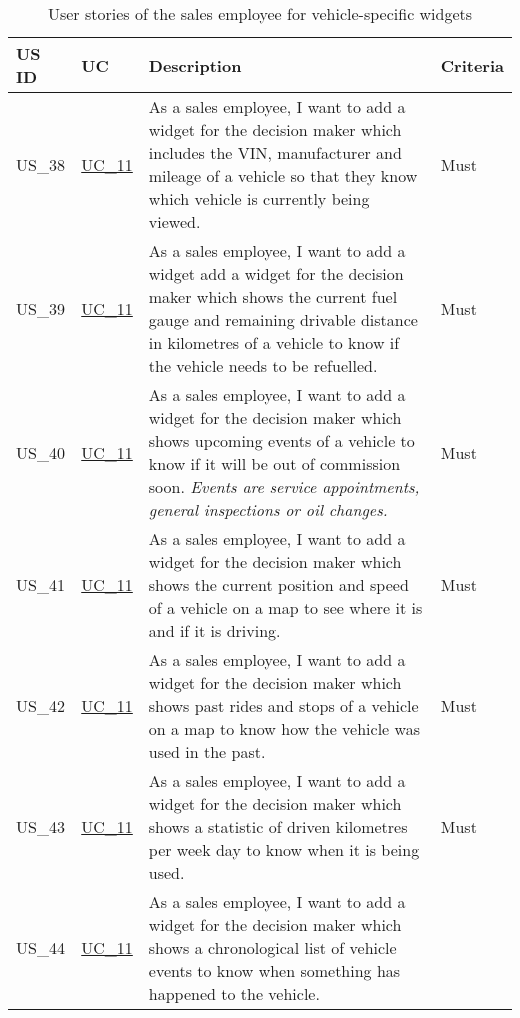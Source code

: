   \sffamily
  \begin{footnotesize}
    \label{FahrzeugWidgets}
    \begin{longtable}[L L L]{ p{} p{} p{} p{} }
      \caption                       %
          {User stories of the sales employee for vehicle-specific widgets} %
          \\
      \toprule
      \textbf{US ID} & \textbf{UC} & \textbf{Description} & \textbf{Criteria} \\
      \midrule
      \hypertarget{Ref:US38}{US\_38} & \hyperlink{Ref:UC11}{UC\_11} & As a sales employee, I want to add a widget for the decision maker which includes the VIN, manufacturer and mileage of a vehicle so that they know which vehicle is currently being viewed. & Must \\
      \hypertarget{Ref:US39}{US\_39} & \hyperlink{Ref:UC11}{UC\_11} & As a sales employee, I want to add a widget add a widget for the decision maker which shows the current fuel gauge and remaining drivable distance in kilometres of a vehicle to know if the vehicle needs to be refuelled. & Must \\
      \hypertarget{Ref:US40}{US\_40} & \hyperlink{Ref:UC11}{UC\_11} & As a sales employee, I want to add a widget for the decision maker which shows upcoming events of a vehicle to know if it will be out of commission soon.
      \newline
      \emph{Events are service appointments, general inspections or oil changes.} & Must \\
      \hypertarget{Ref:US41}{US\_41} & \hyperlink{Ref:UC11}{UC\_11} & As a sales employee, I want to add a widget for the decision maker which shows the current position and speed of a vehicle on a map to see where it is and if it is driving. & Must \\
      \hypertarget{Ref:US42}{US\_42} & \hyperlink{Ref:UC11}{UC\_11} & As a sales employee, I want to add a widget for the decision maker which shows past rides and stops of a vehicle on a map to know how the vehicle was used in the past. & Must \\
      \hypertarget{Ref:US43}{US\_43} & \hyperlink{Ref:UC11}{UC\_11} & As a sales employee, I want to add a widget for the decision maker which shows a statistic of driven kilometres per week day to know when it is being used. & Must \\
      \hypertarget{Ref:US44}{US\_44} & \hyperlink{Ref:UC11}{UC\_11} & As a sales employee, I want to add a widget for the decision maker which shows a chronological list of vehicle events to know when something has happened to the vehicle. 

\end{longtable}
\end{footnotesize}

